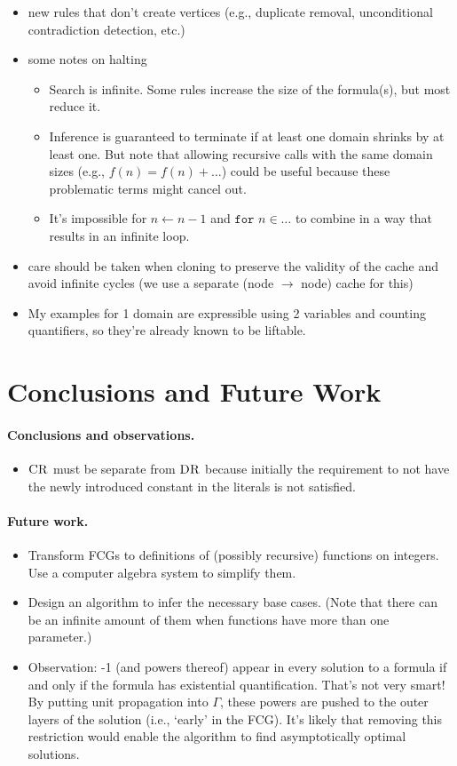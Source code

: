 \begin{itemize}
\item new rules that don't create vertices (e.g., duplicate removal, unconditional contradiction detection, etc.)
\item some notes on halting
  \begin{itemize}
  \item Search is infinite. Some rules increase the size of the formula(s), but most reduce it.
  \item Inference is guaranteed to terminate if at least one domain shrinks by at least one. But note that allowing recursive calls with the same domain sizes (e.g., $f(n) = f(n) + \dots$) could be useful because these problematic terms might cancel out.
  \item It's impossible for $n \gets n - 1$ and $\texttt{for } n \in \dots$ to combine in a way that results in an infinite loop.
  \end{itemize}
\item care should be taken when cloning to preserve the validity of the cache and avoid infinite cycles (we use a separate (node $\to$ node) cache for this)
\item My examples for 1 domain are expressible using 2 variables and counting quantifiers, so they're already known to be liftable.
\end{itemize}

\section{Conclusions and Future Work}

\paragraph{Conclusions and observations.}
\begin{itemize}
\item $\operatorname{\textsc{CR}}$ must be separate from $\operatorname{\textsc{DR}}$ because initially the requirement to not have the newly introduced constant in the literals is not satisfied.
\end{itemize}

\paragraph{Future work.}
\begin{itemize}
\item Transform FCGs to definitions of (possibly recursive) functions on integers. Use a computer algebra system to simplify them.
\item Design an algorithm to infer the necessary base cases. (Note that there can be an infinite amount of them when functions have more than one parameter.)
\item Observation: -1 (and powers thereof) appear in every solution to a formula if and only if the formula has existential quantification. That's not very smart! By putting unit propagation into $\Gamma$, these powers are pushed to the outer layers of the solution (i.e., `early' in the FCG). It's likely that removing this restriction would enable the algorithm to find asymptotically optimal solutions.
\end{itemize}
